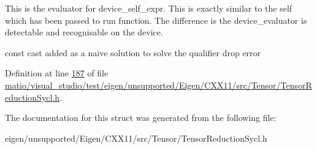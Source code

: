 This is the evaluator for device\+\_\+self\+\_\+expr. This is exactly similar to the self which has been passed to run function. The difference is the device\+\_\+evaluator is detectable and recognisable on the device.

const cast added as a naive solution to solve the qualifier drop error 

Definition at line \hyperlink{matio_2visual__studio_2test_2eigen_2unsupported_2_eigen_2_c_x_x11_2src_2_tensor_2_tensor_reduction_sycl_8h_source_l00187}{187} of file \hyperlink{matio_2visual__studio_2test_2eigen_2unsupported_2_eigen_2_c_x_x11_2src_2_tensor_2_tensor_reduction_sycl_8h_source}{matio/visual\+\_\+studio/test/eigen/unsupported/\+Eigen/\+C\+X\+X11/src/\+Tensor/\+Tensor\+Reduction\+Sycl.\+h}.



The documentation for this struct was generated from the following file\+:\begin{DoxyCompactItemize}
\item 
eigen/unsupported/\+Eigen/\+C\+X\+X11/src/\+Tensor/\+Tensor\+Reduction\+Sycl.\+h\end{DoxyCompactItemize}
